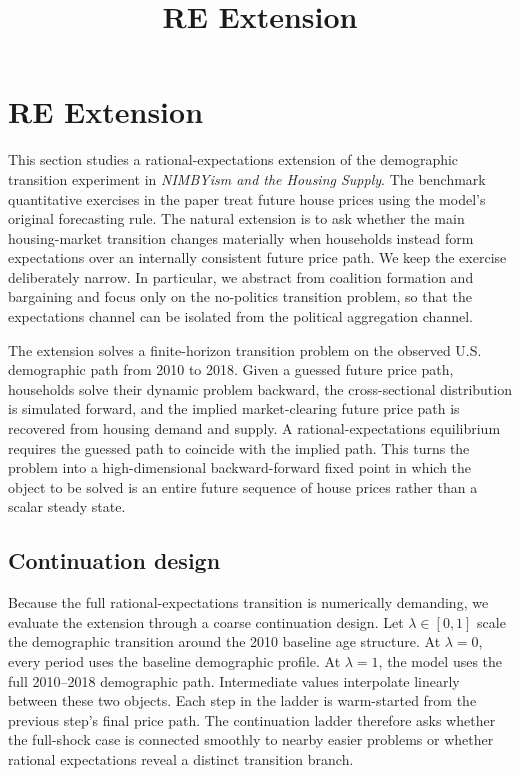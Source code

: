 \documentclass[11pt]{article}
\title{RE Extension}
\author{}
\date{}
\begin{document}
\maketitle

\section{RE Extension}

This section studies a rational-expectations extension of the demographic transition experiment in
\textit{NIMBYism and the Housing Supply}. The benchmark quantitative exercises in the paper treat
future house prices using the model's original forecasting rule. The natural extension is to ask
whether the main housing-market transition changes materially when households instead form
expectations over an internally consistent future price path. We keep the exercise deliberately
narrow. In particular, we abstract from coalition formation and bargaining and focus only on the
no-politics transition problem, so that the expectations channel can be isolated from the political
aggregation channel.

The extension solves a finite-horizon transition problem on the observed U.S. demographic path from
2010 to 2018. Given a guessed future price path, households solve their dynamic problem backward,
the cross-sectional distribution is simulated forward, and the implied market-clearing future price
path is recovered from housing demand and supply. A rational-expectations equilibrium requires the
guessed path to coincide with the implied path. This turns the problem into a high-dimensional
backward-forward fixed point in which the object to be solved is an entire future sequence of house
prices rather than a scalar steady state.

\subsection*{Continuation design}

Because the full rational-expectations transition is numerically demanding, we evaluate the
extension through a coarse continuation design. Let $\lambda \in [0,1]$ scale the demographic
transition around the 2010 baseline age structure. At $\lambda = 0$, every period uses the
baseline demographic profile. At $\lambda = 1$, the model uses the full 2010--2018 demographic
path. Intermediate values interpolate linearly between these two objects. Each step in the ladder
is warm-started from the previous step's final price path. The continuation ladder therefore asks
whether the full-shock case is connected smoothly to nearby easier problems or whether rational
expectations reveal a distinct transition branch.
\end{document}
